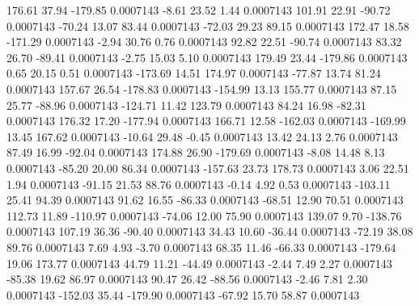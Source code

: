       176.61       37.94     -179.85     0.0007143
       -8.61       23.52        1.44     0.0007143
      101.91       22.91      -90.72     0.0007143
      -70.24       13.07       83.44     0.0007143
      -72.03       29.23       89.15     0.0007143
      172.47       18.58     -171.29     0.0007143
       -2.94       30.76        0.76     0.0007143
       92.82       22.51      -90.74     0.0007143
       83.32       26.70      -89.41     0.0007143
       -2.75       15.03        5.10     0.0007143
      179.49       23.44     -179.86     0.0007143
        0.65       20.15        0.51     0.0007143
     -173.69       14.51      174.97     0.0007143
      -77.87       13.74       81.24     0.0007143
      157.67       26.54     -178.83     0.0007143
     -154.99       13.13      155.77     0.0007143
       87.15       25.77      -88.96     0.0007143
     -124.71       11.42      123.79     0.0007143
       84.24       16.98      -82.31     0.0007143
      176.32       17.20     -177.94     0.0007143
      166.71       12.58     -162.03     0.0007143
     -169.99       13.45      167.62     0.0007143
      -10.64       29.48       -0.45     0.0007143
       13.42       24.13        2.76     0.0007143
       87.49       16.99      -92.04     0.0007143
      174.88       26.90     -179.69     0.0007143
       -8.08       14.48        8.13     0.0007143
      -85.20       20.00       86.34     0.0007143
     -157.63       23.73      178.73     0.0007143
        3.06       22.51        1.94     0.0007143
      -91.15       21.53       88.76     0.0007143
       -0.14        4.92        0.53     0.0007143
     -103.11       25.41       94.39     0.0007143
       91.62       16.55      -86.33     0.0007143
      -68.51       12.90       70.51     0.0007143
      112.73       11.89     -110.97     0.0007143
      -74.06       12.00       75.90     0.0007143
      139.07        9.70     -138.76     0.0007143
      107.19       36.36      -90.40     0.0007143
       34.43       10.60      -36.44     0.0007143
      -72.19       38.08       89.76     0.0007143
        7.69        4.93       -3.70     0.0007143
       68.35       11.46      -66.33     0.0007143
     -179.64       19.06      173.77     0.0007143
       44.79       11.21      -44.49     0.0007143
       -2.44        7.49        2.27     0.0007143
      -85.38       19.62       86.97     0.0007143
       90.47       26.42      -88.56     0.0007143
       -2.46        7.81        2.30     0.0007143
     -152.03       35.44     -179.90     0.0007143
      -67.92       15.70       58.87     0.0007143
